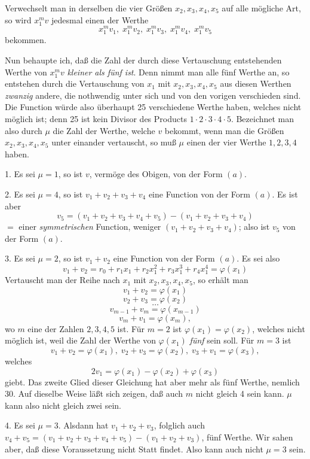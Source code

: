 \documentclass{article}
\begin{document}
Verwechselt man in derselben die vier Größen $x_2, x_3, x_4, x_5$ auf alle mögliche Art, so wird $x_1^{m} v$ jedesmal einen der Werthe
\[ x_1^{m} v_1, \; x_1^{m} v_2, \; x_1^{m} v_3, \; x_1^{m} v_4, \; x_1^{m} v_5 \]
bekommen.

Nun behaupte ich, daß die Zahl der durch diese Vertauschung entstehenden Werthe von $x_1^{m} v$ \emph{kleiner als fünf ist}. Denn nimmt man alle fünf Werthe an, so entstehen durch die Vertauschung von $x_1$ mit $x_2, x_3, x_4, x_5$ aus diesen Werthen \emph{zwanzig} andere, die nothwendig unter sich und von den vorigen verschieden sind. Die Function würde also überhaupt 25 verschiedene Werthe haben, welches nicht möglich ist; denn 25 ist kein Divisor des Products $1 \cdot 2 \cdot 3 \cdot 4 \cdot 5$. Bezeichnet man also durch $\mu$ die Zahl der Werthe, welche $v$ bekommt, wenn man die Größen $x_2, x_3, x_4, x_5$ unter einander vertauscht, so muß $\mu$ einen der vier Werthe $1, 2, 3, 4$ haben.

1. Es sei $\mu = 1$, so ist $v$, vermöge des Obigen, von der Form $(a)$.

2. Es sei $\mu = 4$, so ist $v_1 + v_2 + v_3 + v_4$ eine Function von der Form $(a)$. Es ist aber
\[ v_5 = (v_1 + v_2 + v_3 + v_4 + v_5) - (v_1 + v_2 + v_3 + v_4) \]
$=$ einer \emph{symmetrischen} Function, weniger $(v_1 + v_2 + v_3 + v_4)$; also ist $v_5$ von der Form $(a)$.

3. Es sei $\mu = 2$, so ist $v_1 + v_2$ eine Function von der Form $(a)$. Es sei also
\[ v_1 + v_2 = r_0 + r_1 x_1 + r_2 x_1^{2} + r_3 x_1^{3} + r_4 x_1^{4} = \varphi(x_1) \]
Vertauscht man der Reihe nach $x_1$ mit $x_2, x_3, x_4, x_5$, so erhält man
\[ v_1 + v_2 = \varphi(x_1) \]
\[ v_2 + v_3 = \varphi(x_2) \]
\[ \ldots \]
\[ v_{m-1} + v_m = \varphi(x_{m-1}) \]
\[ v_m + v_1 = \varphi(x_m), \]
wo $m$ eine der Zahlen $2, 3, 4, 5$ ist. Für $m = 2$ ist $\varphi(x_1) = \varphi(x_2)$, welches nicht möglich ist, weil die Zahl der Werthe von $\varphi(x_1)$ \emph{fünf} sein soll. Für $m = 3$ ist
\[ v_1 + v_2 = \varphi(x_1), \; v_2 + v_3 = \varphi(x_2), \; v_3 + v_1 = \varphi(x_3), \]
welches
\[ 2 v_1 = \varphi(x_1) - \varphi(x_2) + \varphi(x_3) \]
giebt. Das zweite Glied dieser Gleichung hat aber mehr als fünf Werthe, nemlich 30. Auf dieselbe Weise läßt sich zeigen, daß auch $m$ nicht gleich 4 sein kann. $\mu$ kann also nicht gleich zwei sein.

4. Es sei $\mu = 3$. Alsdann hat $v_1 + v_2 + v_3$, folglich auch $v_4 + v_5 = (v_1 + v_2 + v_3 + v_4 + v_5) - (v_1 + v_2 + v_3)$, fünf Werthe. Wir sahen aber, daß diese Voraussetzung nicht Statt findet. Also kann auch nicht $\mu = 3$ sein.
\end{document}

